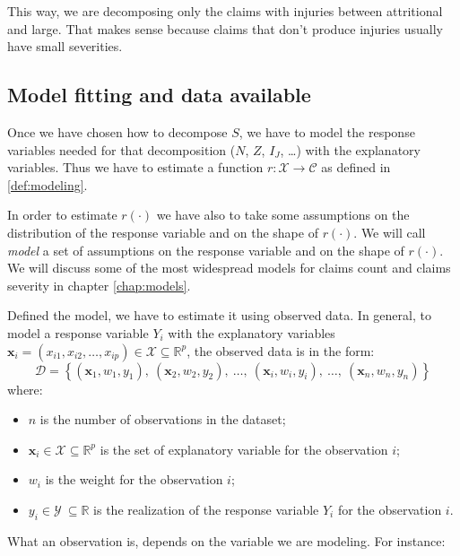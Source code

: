 \documentclass[a4paper, twoside, openright, 12pt]{report}
\providecommand{\tightlist}{%
  \setlength{\itemsep}{0pt}\setlength{\parskip}{0pt}}
\theoremstyle{definition}
\theoremstyle{definition}
\theoremstyle{definition}
\theoremstyle{remark}
\begin{document}
This way, we are decomposing only the claims with injuries between attritional and large. That makes sense because claims that don't produce injuries usually have small severities.

\hypertarget{chap:model-fitting-and-data-available}{%
\subsection{Model fitting and data available}\label{chap:model-fitting-and-data-available}}

Once we have chosen how to decompose \(S\), we have to model the response variables needed for that decomposition (\(N\), \(Z\), \(I_J\), \ldots) with the explanatory variables. Thus we have to estimate a function \(r:\mathcal{X}\rightarrow \mathcal{C}\) as defined in \ref{def:modeling}.

In order to estimate \(r(\cdot)\) we have also to take some assumptions on the distribution of the response variable and on the shape of \(r(\cdot)\). We will call \emph{model} a set of assumptions on the response variable and on the shape of \(r(\cdot)\). We will discuss some of the most widespread models for claims count and claims severity in chapter \ref{chap:models}.

Defined the model, we have to estimate it using observed data. In general, to model a response variable \(Y_i\) with the explanatory variables \(\boldsymbol{x}_i=(x_{i1}, x_{i2}, \dots, x_{ip})\in \mathcal{X} \subseteq \mathbb{R}^p\), the observed data is in the form:
\[
\mathcal{D} = \left\{(\boldsymbol{x}_1, w_1, y_1), \ (\boldsymbol{x}_2, w_2, y_2), \ \dots, \ (\boldsymbol{x}_i, w_i, y_i), \ \dots, \ (\boldsymbol{x}_n, w_n, y_n)\right\}
\]
where:

\begin{itemize}
\tightlist
\item
  \(n\) is the number of observations in the dataset;
\item
  \(\boldsymbol{x}_i\in \mathcal{X} \subseteq \mathbb{R}^p\) is the set of explanatory variable for the observation \(i\);
\item
  \(w_i\) is the weight for the observation \(i\);
\item
  \(y_i\in \mathcal{Y}\ \subseteq \mathbb{R}\) is the realization of the response variable \(Y_i\) for the observation \(i\).
\end{itemize}

What an observation is, depends on the variable we are modeling. For instance:
\end{document}
